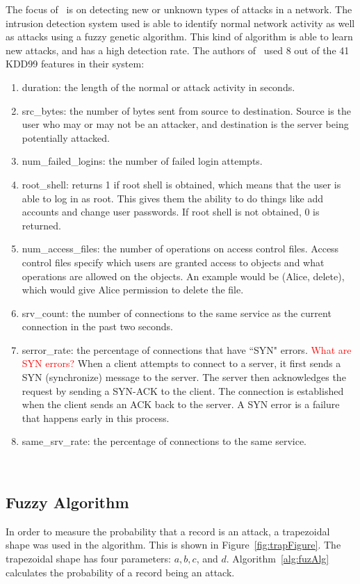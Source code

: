 \documentclass{sig-alternate}
\newcommand{\mycomment}[1]{\textcolor{red}{#1}}
\begin{document}
The focus of~\cite{6496342, 6559603} is on detecting new or unknown types of attacks in a network. The intrusion detection system used is able to identify normal network activity as well as attacks using a fuzzy genetic algorithm. This kind of algorithm is able to learn new attacks, and has a high detection rate. The authors of~\cite{6496342, 6559603} used 8 out of the 41 KDD99 features in their system: 
\begin{enumerate}
  \item duration: the length of the normal or attack activity in seconds.
  \item src\_bytes: the number of bytes sent from source to destination. Source is the user who may or may not be an attacker, and destination is the server being potentially attacked.
  \item num\_failed\_logins: the number of failed login attempts.
  \item root\_shell: returns 1 if root shell is obtained, which means that the user is able to log in as root. This gives them the ability to do things like add accounts and change user passwords. If root shell is not obtained, 0 is returned.
  \item num\_access\_files: the number of operations on access control files. Access control files specify which users are granted access to objects and what operations are allowed on the objects. An example would be (Alice, delete), which would give Alice permission to delete the file.~\cite{accessControl}
  \item srv\_count: the number of connections to the same service as the current connection in the past two seconds.
  \item serror\_rate: the percentage of connections that have ``SYN" errors. \mycomment{What are SYN errors?} When a client attempts to connect to a server, it first sends a SYN (synchronize) message to the server. The server then acknowledges the request by sending a SYN-ACK to the client. The connection is established when the client sends an ACK back to the server. A SYN error is a failure that happens early in this process.~\cite{TCP}
  \item same\_srv\_rate: the percentage of connections to the same service.
\end{enumerate}

~\cite{KDD99}




\subsection{Fuzzy Algorithm}
In order to measure the probability that a record is an attack, a trapezoidal shape was used in the algorithm. This is shown in Figure~\ref{fig:trapFigure}. The trapezoidal shape has four parameters: $a, b, c$, and $d$. Algorithm~\ref{alg:fuzAlg} calculates the probability of a record being an attack.
\end{document}

